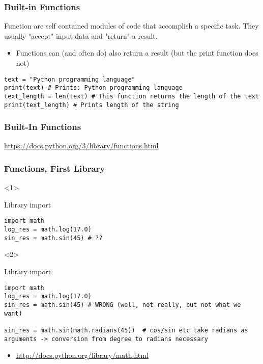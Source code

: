 \documentclass[10pt, a4paper]{beamer} %
\begin{document}
\begin{frame}
	\frametitle{Built-in Functions}
	Function are self contained modules of code that accomplish a specific task. They usually "accept" input data and "return" a result.
	\begin{itemize}
		\begin{lstlisting}
name = "Some name"
print(name) # Some name is used inside the print function -> the print function accepts the input and prints it to the console
    \end{lstlisting}
		\item Functions can (and often do) also return a result (but the print function does not)
	\end{itemize}

	\begin{examples}
		\begin{lstlisting}
text = "Python programming language"
print(text) # Prints: Python programming language
text_length = len(text) # This function returns the length of the text
print(text_length) # Prints length of the string
  \end{lstlisting}
	\end{examples}
\end{frame}

\begin{frame}[c]\frametitle{Built-In Functions}
	\url{https://docs.python.org/3/library/functions.html}
\end{frame}

\begin{frame}[t, fragile]\frametitle{Functions, First Library}
	\begin{onlyenv}
		\begin{block}{Library import}
			\begin{lstlisting}
import math
log_res = math.log(17.0)
sin_res = math.sin(45) # ??
  \end{lstlisting}
		\end{block}
	\end{onlyenv}

	\begin{onlyenv}
		\begin{block}{Library import}
			\begin{lstlisting}
import math
log_res = math.log(17.0)
sin_res = math.sin(45) # WRONG (well, not really, but not what we want)

sin_res = math.sin(math.radians(45))  # cos/sin etc take radians as arguments -> conversion from degree to radians necessary
  \end{lstlisting}
		\end{block}
	\end{onlyenv}

	\begin{itemize}
		\item \tiny \url{http://docs.python.org/library/math.html}
	\end{itemize}
\end{frame}
\end{document}
